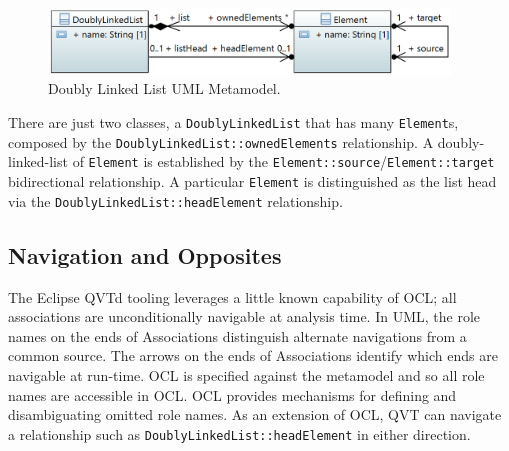 \documentclass{llncs}
\begin{document}
\begin{figure}[h]
	\centering
	\includegraphics[width=0.95\textwidth]{doublylinkedlist.png}
	\caption{Doubly Linked List UML Metamodel.}
	\label{fig:Doubly Linked List UML Metamodel}
\end{figure}

There are just two classes, a \verb$DoublyLinkedList$ that has many \verb$Element$s, composed by the \verb$DoublyLinkedList::ownedElements$ relationship. A doubly-linked-list of \verb$Element$ is established by the \verb$Element::source$/\verb$Element::target$ bidirectional relationship. A particular \verb$Element$ is distinguished as the list head via the \verb$DoublyLinkedList::headElement$ relationship.

\subsection{Navigation and Opposites}

The Eclipse QVTd tooling leverages a little known capability of OCL; all associations are unconditionally navigable at analysis time. In UML, the role names on the ends of Associations distinguish alternate navigations from a common source. The arrows on the ends of Associations identify which ends are navigable at run-time. OCL is specified against the metamodel and so all role names are accessible in OCL. OCL provides mechanisms for defining and disambiguating omitted role names. As an extension of OCL, QVT can navigate a relationship such as \verb$DoublyLinkedList::headElement$ in either direction.

\end{document}
